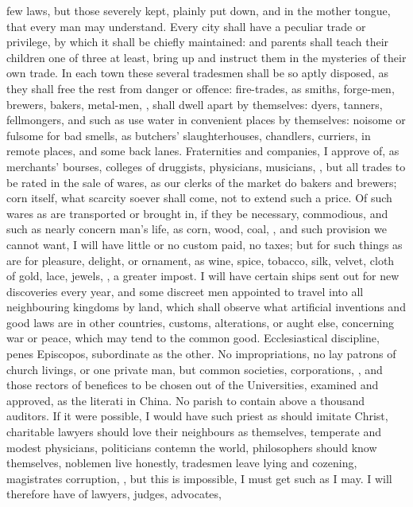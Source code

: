few laws, but those severely kept, plainly put down, and in the mother
tongue, that every man may understand. Every city shall have a peculiar
trade or privilege, by which it shall be chiefly maintained: and
parents shall teach their children one of three at least, bring up and
instruct them in the mysteries of their own trade. In each town these
several tradesmen shall be so aptly disposed, as they shall free the
rest from danger or offence: fire-trades, as smiths, forge-men,
brewers, bakers, metal-men, \etc{}, shall dwell apart by themselves:
dyers, tanners, fellmongers, and such as use water in convenient places
by themselves: noisome or fulsome for bad smells, as butchers'
slaughterhouses, chandlers, curriers, in remote places, and some back
lanes. Fraternities and companies, I approve of, as merchants' bourses,
colleges of druggists, physicians, musicians, \etc{}, but all trades to be
rated in the sale of wares, as our clerks of the market do bakers and
brewers; corn itself, what scarcity soever shall come, not to extend
such a price. Of such wares as are transported or brought in, if
they be necessary, commodious, and such as nearly concern man's life,
as corn, wood, coal, \etc{}, and such provision we cannot want, I will
have little or no custom paid, no taxes; but for such things as are for
pleasure, delight, or ornament, as wine, spice, tobacco, silk, velvet,
cloth of gold, lace, jewels, \etc{}, a greater impost. I will have certain
ships sent out for new discoveries every year, and some discreet
men appointed to travel into all neighbouring kingdoms by land, which
shall observe what artificial inventions and good laws are in other
countries, customs, alterations, or aught else, concerning war or
peace, which may tend to the common good. Ecclesiastical discipline,
penes Episcopos, subordinate as the other. No impropriations, no lay
patrons of church livings, or one private man, but common societies,
corporations, \etc{}, and those rectors of benefices to be chosen out of
the Universities, examined and approved, as the literati in China. No
parish to contain above a thousand auditors. If it were possible, I
would have such priest as should imitate Christ, charitable lawyers
should love their neighbours as themselves, temperate and modest
physicians, politicians contemn the world, philosophers should know
themselves, noblemen live honestly, tradesmen leave lying and cozening,
magistrates corruption, \etc{}, but this is impossible, I must get such as
I may. I will therefore have of lawyers, judges, advocates,
